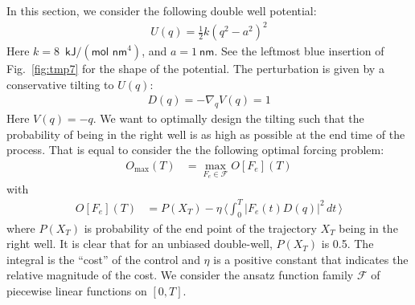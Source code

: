 \documentclass[aip,jcp,a4paper,reprint,onecolumn]{revtex4-1}
\begin{document}
In this section, we consider the following double well potential:
\begin{align}
  U( q) = \frac12 k ( q^2 - a^2)^2
\end{align}
Here $k = 8$~$\textsf{kJ} / (\textsf{mol nm}^4)$, and $ a = 1\
\textsf{nm}$.  See the leftmost blue insertion of Fig.~\ref{fig:tmp7} for
the shape of the potential.
The perturbation is given by a conservative tilting to $U( q)$:
\begin{align}
   D( q) = -\nabla_{ q} V( q) = 1
\end{align}
Here $V( q) = - q$. We want to
optimally design the tilting such that the probability
of being in the right well is as high as possible 
at the end time of the process. That is equal to consider the 
the following optimal forcing problem:
\begin{align}
  O_{\max}(T)& = \max_{F_e\in\mathcal F} O[F_e](T) 
\end{align}
with
\begin{align}
  O[F_e](T) &= P( X_T) -
  \eta\,
  \big\langle \int_0^T\vert F_e(t) D( q)\vert^2\, dt\,
  \big\rangle
\end{align}
where $P( X_T)$ is probability of the end point of the trajectory
$ X_T$ being in the right well.  It is
clear that for an unbiased double-well, $P( X_T)$
is 0.5.  The integral is the ``cost'' of the control and $\eta$ is a
positive constant that indicates the relative magnitude of the
cost. We consider the ansatz function family $\mathcal F$ of piecewise
linear functions on $[0, T]$.
\end{document}
